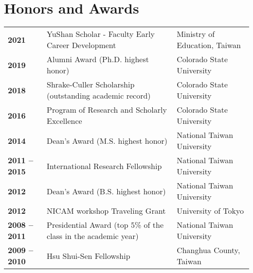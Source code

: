 \documentclass{article}
\begin{document}
\section{\color{airforceblue}Honors and Awards}
\begin{tabular}{>{\bfseries}p{2.5cm}p{10cm}p{\linewidth-2.5cm\relax}}
     2021   & YuShan Scholar - Faculty Early Career Development & Ministry of Education, Taiwan  
     \\ 
     2019   & Alumni Award (Ph.D. highest honor) & Colorado State University 
     \\
     2018   & Shrake-Culler Scholarship (outstanding academic record) & Colorado State University 
     \\  
	 2016   & Program of Research and Scholarly Excellence & Colorado State University 
	 \\
     2014  & Dean’s Award (M.S. highest honor) & National Taiwan University 
     \\
     2011 -- 2015 & International Research Fellowship & National Taiwan University 
     \\
     2012        & Dean’s Award (B.S. highest honor) & National Taiwan University  
     \\
     2012        & NICAM workshop Traveling Grant  & University of Tokyo
     \\  
     2008 -- 2011 & Presidential Award (top 5\% of the class in the academic year) & National Taiwan University 
     \\

     2009 -- 2010 & Hsu Shui-Sen Fellowship   & Changhua County, Taiwan 
     
\end{tabular}
\end{document}
